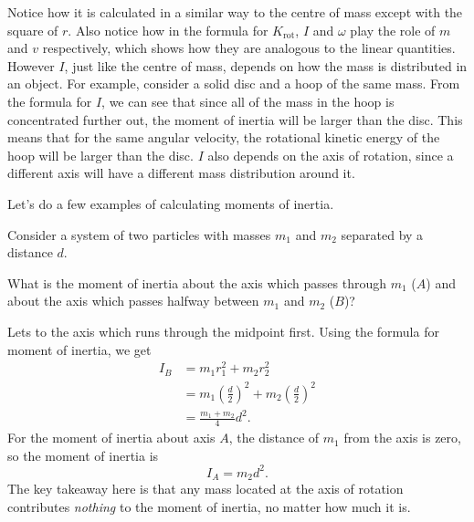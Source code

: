 \documentclass[../classical_mechanics.tex]{subfiles}
\begin{document}
        Notice how it is calculated in a similar way to the centre of mass except with the square of $r$.
        Also notice how in the formula for $K_\text{rot}$, $I$ and $\omega$ play the role of $m$ and $v$ respectively, which shows how they are analogous to the linear quantities.
        However $I$, just like the centre of mass, depends on how the mass is distributed in an object.
        For example, consider a solid disc and a hoop of the same mass.
        From the formula for $I$, we can see that since all of the mass in the hoop is concentrated further out, the moment of inertia will be larger than the disc.
        This means that for the same angular velocity, the rotational kinetic energy of the hoop will be larger than the disc.
        $I$ also depends on the axis of rotation, since a different axis will have a different mass distribution around it.

        Let's do a few examples of calculating moments of inertia.
        \begin{example}
            Consider a system of two particles with masses $m_1$ and $m_2$ separated by a distance $d$.
            \begin{figure}[H]
                \centering
            \end{figure}
            What is the moment of inertia about the axis which passes through $m_1$ ($A$) and about the axis which passes halfway between $m_1$ and $m_2$ ($B$)?

            Lets to the axis which runs through the midpoint first.
            Using the formula for moment of inertia, we get
            \begin{align}
                I_B&=m_1r_1^2+m_2r_2^2\\
                &=m_1\left(\frac{d}{2}\right)^2+m_2\left(\frac{d}{2}\right)^2\\
                &=\frac{m_1+m_2}{4}d^2.
            \end{align}
            For the moment of inertia about axis $A$, the distance of $m_1$ from the axis is zero, so the moment of inertia is
            \begin{equation}
                I_A=m_2 d^2.
            \end{equation}
            The key takeaway here is that any mass located at the axis of rotation contributes \textit{nothing} to the moment of inertia, no matter how much it is.
        \end{example}
\end{document}

